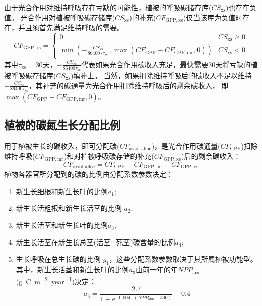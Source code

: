 由于光合作用对维持呼吸存在亏缺的可能性，植被的呼吸碳储存库($CS_{\mathrm{xs}}$)也存在负值。
光合作用对植被呼吸碳存储库($CS_{\mathrm{xs}}$)的补充($CF_{\mathrm{GPP,xs}}$)仅当该库为负值时存在，并且须首先满足维持呼吸的需要。
\begin{equation}
  CF_{\mathrm{GPP, xs}}=\left\{\begin{array}{ll}0 & CS_{\mathrm{xs}} \geqslant 0 \\ \min \left(-\frac{CS_{\mathrm{xs}}}{86400 \cdot \tau_{\mathrm{xs}}}, \max \left(CF_{\mathrm{GPP}}-CF_{\mathrm{GPP, mr}}, 0\right)\right) & CS_{\mathrm{xs}}<0\end{array}\right.
\end{equation}
其中$\tau_{\mathrm{xs}}=30$天，$-\frac{CS_{\mathrm{xs}}}{86400 \tau_{\mathrm{xs}}}$代表如果光合作用碳收入充足，最快需要30天将亏缺的植被呼吸碳存储库($CS_{\mathrm{xs}}$)填补上。
当然，如果扣除维持呼吸后的碳收入不足以维持$-\frac{CS_{\mathrm{xs}}}{86400 \tau_{\mathrm{xs}}}$，其补充的碳通量为光合作用扣除维持呼吸后的剩余碳收入，
即$\max{\left(CF_{\mathrm{GPP}}-CF_{\mathrm{GPP,mr}},0\right)}$。


\subsection{植被的碳氮生长分配比例}\label{植被的碳氮生长分配比例}
用于植被生长的碳收入，即可分配碳($CF_{\mathrm{avail\_alloc}}$)，是光合作用碳通量($CF_{\mathrm{GPP}}$)扣除维持呼吸($CF_{\mathrm{GPP,mr}}$)和对植被呼吸碳存储的补充($CF_{\mathrm{GPP,xs}}$)后的剩余碳收入：
\begin{equation}
  CF_{\mathrm{ {avail\_alloc }}}=CF_{\mathrm{GPP}}-CF_{\mathrm{GPP, mr}}-CF_{\mathrm{GPP, xs}}
\end{equation}
植物各器官所分配到的碳的比例由分配系数参数决定：
\begin{enumerate}
  \item 新生长细根和新生长叶的比例$a_1$;
  \item 新生长活粗根和新生长活茎的比例 $a_2$;
  \item 新生长活茎和新生长叶的比例$a_3$;
  \item 新生长活茎在新生长总茎(活茎+死茎)碳含量的比例$a_4$;
  \item 生长呼吸在总生长碳的比例 $g_1$，这些分配系数参数取决于其所属植被功能型。其中，新生长活茎和新生长叶的比例$a_3$由前一年的年$NPP_{\mathrm{ann}}$ (\unit{g.C.m^{-2}.year^{-1}})决定：
    \begin{equation}
      a_{3}=\frac{2.7}{1+{\mathrm e}^{-0.004 \cdot\left(NPP_{\mathrm{ann}}-300\right)}}-0.4
    \end{equation}
\end{enumerate}

